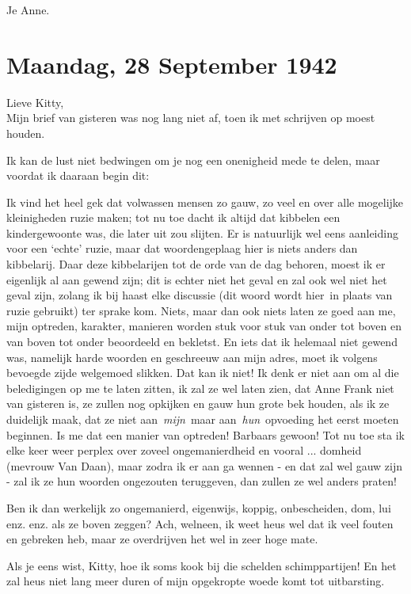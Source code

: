 \documentclass{book}
\begin{document}
Je Anne.

\chapter{Maandag, 28 September 1942}

Lieve Kitty,\\Mijn brief van gisteren was nog lang niet af, toen ik met
schrijven op moest houden.

Ik kan de lust niet bedwingen om je nog een onenigheid mede te delen,
maar voordat ik daaraan begin dit:

Ik vind het heel gek dat volwassen mensen zo gauw, zo veel en over alle
mogelijke kleinigheden ruzie maken; tot nu toe dacht ik altijd dat
kibbelen een kindergewoonte was, die later uit zou slijten. Er is
natuurlijk wel eens aanleiding voor een `echte' ruzie, maar dat
woordengeplaag hier is niets anders dan kibbelarij. Daar deze
kibbelarijen tot de orde van de dag behoren, moest ik er eigenlijk al
aan gewend zijn; dit is echter niet het geval en zal ook wel niet het
geval zijn, zolang ik bij haast elke discussie (dit woord wordt hier~in
plaats van ruzie gebruikt) ter sprake kom. Niets, maar dan ook niets
laten ze goed aan me, mijn optreden, karakter, manieren worden stuk voor
stuk van onder tot boven en van boven tot onder beoordeeld en bekletst.
En iets dat ik helemaal niet gewend was, namelijk harde woorden en
geschreeuw aan mijn adres, moet ik volgens bevoegde zijde welgemoed
slikken. Dat kan ik niet! Ik denk er niet aan om al die beledigingen op
me te laten zitten, ik zal ze wel laten zien, dat Anne Frank niet van
gisteren is, ze zullen nog opkijken en gauw hun grote bek houden, als ik
ze duidelijk maak, dat ze niet aan~\emph{mijn}~maar
aan~\emph{hun}~opvoeding het eerst moeten beginnen. Is me dat een manier
van optreden! Barbaars gewoon! Tot nu toe sta ik elke keer weer perplex
over zoveel ongemanierdheid en vooral ... domheid (mevrouw Van Daan),
maar zodra ik er aan ga wennen - en dat zal wel gauw zijn - zal ik ze
hun woorden ongezouten teruggeven, dan zullen ze wel anders praten!

Ben ik dan werkelijk zo ongemanierd, eigenwijs, koppig, onbescheiden,
dom, lui enz. enz. als ze boven zeggen? Ach, welneen, ik weet heus wel
dat ik veel fouten en gebreken heb, maar ze overdrijven het wel in zeer
hoge mate.

Als je eens wist, Kitty, hoe ik soms kook bij die schelden
schimppartijen! En het zal heus niet lang meer duren of mijn opgekropte
woede komt tot uitbarsting.
\end{document}
